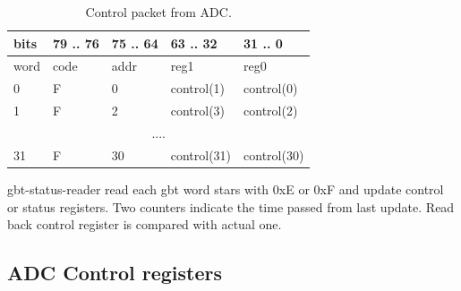 \documentclass{article}
\begin{document}
\begin{table}[H]
\centering
\begin{tabular}{| l | l | l | l | l |}
\hline
 bits & 79 .. 76 & 75 .. 64 & 63 .. 32 & 31 .. 0 \\ \hline
word & code & addr & reg1 & reg0 \\ \hline
0 & F & 0 & control(1) & control(0) \\ \hline
1 & F & 2 & control(3) & control(2) \\ \hline
\multicolumn{5}{|c|}{....} \\ \hline
31 & F & 30 & control(31) & control(30) \\ \hline
\end{tabular}
\caption{Control packet from ADC.\label{tab4}}
\end{table}

gbt-status-reader read each gbt word stars with 0xE or 0xF and update control or status registers. Two counters indicate the time passed from last update. Read back control register is compared with actual one. 




\subsection{ADC Control registers}
\end{document}
